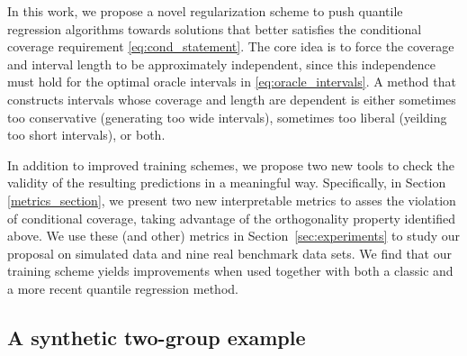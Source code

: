 \documentclass{article}
\begin{document}
In this work, we propose a novel regularization scheme to push quantile regression algorithms towards solutions that better satisfies the conditional coverage requirement \eqref{eq:cond_statement}. The core idea is to force the coverage and interval length to be approximately independent, since this independence must hold for the optimal oracle intervals in \eqref{eq:oracle_intervals}. A method that constructs intervals whose coverage and length are dependent is either sometimes too conservative (generating too wide intervals), sometimes too liberal (yeilding too short intervals), or both. 

In addition to improved training schemes, we propose two new tools to check the validity of the resulting predictions in a meaningful way. Specifically, in Section \ref{metrics_section}, we present two new interpretable metrics to asses the violation of conditional coverage, taking advantage of the orthogonality property identified above.
We use these (and other) metrics in Section~\ref{sec:experiments} to study our proposal on simulated data and nine real benchmark data sets. We find that our training scheme yields improvements when used together with both a classic \cite{QR} and a more recent \cite{beyond_pinball_loss}
 quantile regression method.



\subsection*{A synthetic two-group example}\label{syn_example}
\end{document}
